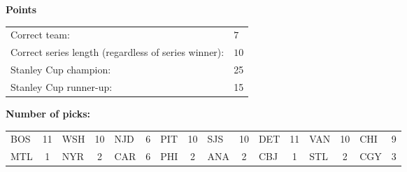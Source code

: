 \documentclass[10pt]{article}
\begin{document}
{\bf Points}\\
\begin{minipage}{12cm}
    \begin{tabular}{l l}
        Correct team:	& $7$\\
        Correct series length (regardless of series winner):	& $10$\\
        Stanley Cup champion:	& 25\\
        Stanley Cup runner-up:	& 15\\
    \end{tabular}

    \vspace{0.5cm}
    {\bf Number of picks:}\\
    \begin{tabular}{lc | lc | lc | lc | lc | lc | lc | lc }
        BOS & 11 & WSH & 10 & NJD & 6 & PIT & 10 & SJS & 10 & DET & 11 & VAN & 10 & CHI & 9 \\
        MTL & 1 & NYR & 2 & CAR & 6 & PHI & 2 & ANA & 2 & CBJ & 1 & STL & 2 & CGY & 3 \\
    \end{tabular}
\end{minipage}
\end{document}
